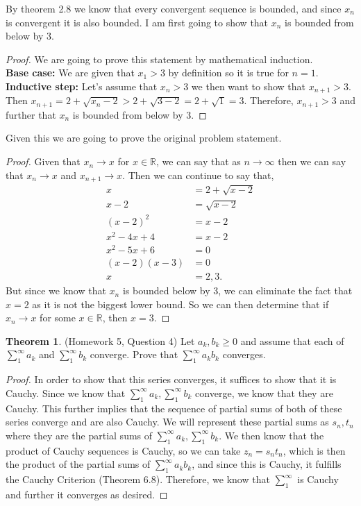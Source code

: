 \documentclass{article}
\theoremstyle{definition}
\newtheorem{theorem}{Theorem}
\newcommand{\R}{\mathbb{R}}
\begin{document}
By theorem 2.8 we know that every convergent sequence is bounded, and since $x_n$ is convergent it is also bounded. I am first going to show that $x_n$ is bounded from below by $3.$
\begin{proof}
We are going to prove this statement by mathematical induction.\\
\textbf{Base case:} We are given that $x_1>3$ by definition so it is true for $n=1$.\\
\textbf{Inductive step:} Let's assume that $x_n>3$ we then want to show that $x_{n+1}>3$. Then $x_{n+1} = 2 + \sqrt{x_n-2} > 2 + \sqrt{3-2} = 2 + \sqrt{1} = 3.$ Therefore, $x_{n+1} > 3$ and further that $x_n$ is bounded from below by $3.$
\end{proof}
Given this we are going to prove the original problem statement.
\begin{proof}
Given that $x_n \rightarrow x$ for $x\in \R$, we can say that as $n \rightarrow \infty$ then we can say that $x_n \rightarrow x$ and $x_{n+1} \rightarrow x$. Then we can continue to say that,
\begin{align*}
    x &= 2 + \sqrt{x - 2}\\
    x - 2 &= \sqrt{x - 2}\\
    (x - 2)^2 &= x - 2\\
    x^2 - 4x + 4 &= x - 2\\
    x^2 - 5x + 6 &= 0\\
    (x - 2)(x - 3) &= 0\\
    x &= 2, 3.
\end{align*} But since we know that $x_n$ is bounded below by 3, we can eliminate the fact that $x = 2$ as it is not the biggest lower bound. So we can then determine that if $x_n \rightarrow x$ for some $x\in \R$, then $x = 3.$
\end{proof}

\pagebreak
\begin{theorem}
(Homework 5, Question 4) Let $a_k, b_k \geq 0$ and assume that each of $\sum_1^\infty a_k$ and 
$\sum_1^\infty b_k$ converge. Prove that $\sum_1^\infty a_k b_k$ converges. 
\end{theorem}

\begin{proof}
In order to show that this series converges, it suffices to show that it is Cauchy. Since we know that $\sum_1^\infty a_k, \sum_1^\infty b_k$ converge, we know that they are Cauchy. This further implies that the sequence of partial sums of both of these series converge and are also Cauchy. We will represent these partial sums as $s_n, t_n$ where they are the partial sums of $\sum_1^\infty a_k, \sum_1^\infty b_k$. We then know that the product of Cauchy sequences is Cauchy, so we can take $z_n = s_nt_n$, which is then the product of the partial sums of $\sum_1^\infty a_kb_k$, and since this is Cauchy, it fulfills the Cauchy Criterion (Theorem 6.8). Therefore, we know that $\sum_1^\infty$ is Cauchy and further it converges as desired.
\end{proof}
\end{document}
